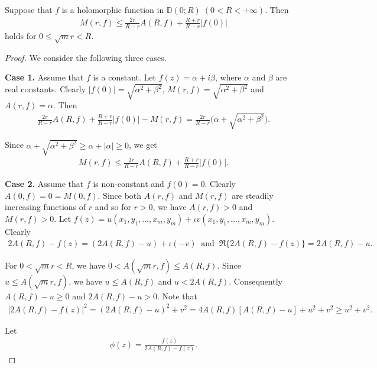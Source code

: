 \documentclass[10pt,a4paper]{amsart}
\newcommand{\ol}{\overline}
\begin{document}
\begin{lem}\label{t2.1} Suppose that $f$ is a holomorphic function in $\ol{\mathbb{D}(0;R)}\;(0<R<+\infty)$. Then
\begin{align*}
 M(r,f)\leq \frac{2r}{R-r}A(R,f)+\frac{R+r}{R-r} |f(0)|
\end{align*}
holds for $0\leq \sqrt{m}r< R$.
\end{lem}

\begin{proof} We consider the following three cases.
\vspace{1.2mm}

{\bf Case 1.} Assume that $f$ is a constant. Let $f(z)=\alpha+i\beta$, where $\alpha$ and $\beta$ are real constants. Clearly $|f(0)|=\sqrt{\alpha^{2}+\beta^{2}}$, $M(r,f)=\sqrt{\alpha^{2}+\beta^{2}}$ and $A(r,f)=\alpha$. Then
\begin{align*}
 \frac{2r}{R-r}A(R,f)+\frac{R+r}{R-r}|f(0)|-M(r,f)=\frac{2r}{R-r}\Big(\alpha+\sqrt{\alpha^{2}+\beta^{2}}\Big).
 \end{align*}

Since $\alpha+\sqrt{\alpha^{2}+\beta^{2}}\geq \alpha+|\alpha|\geq 0$, we get
\begin{align*}
M(r,f)\leq \frac{2r}{R-r}A(R,f)+\frac{R+r}{R-r}|f(0)|.
\end{align*}
\vspace{1.2mm}

{\bf Case 2.} Assume that $f$ is non-constant and $f(0)=0$. Clearly $A(0,f)=0=M(0,f)$. Since both $A(r,f)$ and $M(r,f)$ are steadily increasing functions of $r$ and so for $r>0$, we have $A(r,f)>0$ and $M(r,f)>0$. Let $f(z)=u(x_1,y_1,\ldots,x_m,y_m)+\iota v(x_1,y_1,\ldots,x_m,y_m)$. Clearly
\begin{align*}
 2A(R,f)-f(z)=(2A(R,f)-u)+\iota (-v)\;\;\text{and}\;\;\Re\{2A(R,f)-f(z)\}=2A(R,f)-u.
 \end{align*}

For $0<\sqrt{m}r<R$, we have $0<A(\sqrt{m}r,f)\leq A(R,f)$. Since $u\leq A(\sqrt{m}r,f)$, we have $u\leq A(R,f)$ and $u<2A(R,f)$. Consequently $A(R,f)-u\geq 0$ and $2A(R,f)-u>0$. Note that
\begin{align}\label{pd1} 
|2A(R,f)-f(z)|^{2}=(2A(R,f)-u)^{2}+v^{2}=4A(R,f)[A(R,f)-u]+u^{2}+v^{2}\geq u^{2}+v^{2}.
\end{align}

Let 
\begin{align}\label{pd2} 
\phi(z)=\frac{f(z)}{2A(R,f)-f(z)}.
\end{align}


\end{proof}
\end{document}
